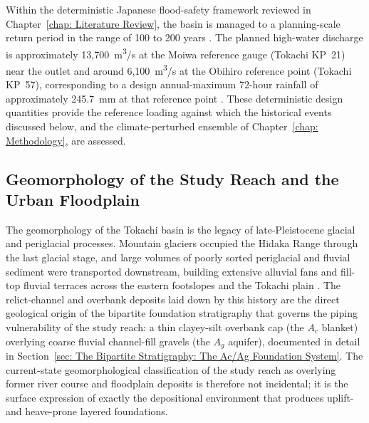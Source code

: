 Within the deterministic Japanese flood-safety framework reviewed in Chapter~\ref{chap: Literature Review}, the basin is managed to a planning-scale return period in the range of 100 to 200 years \parencite{final_report_2022, wp1_report_2021}. The planned high-water discharge is approximately 13{,}700~m\textsuperscript{3}/s at the Moiwa reference gauge (Tokachi KP~21) near the outlet and around 6{,}100~m\textsuperscript{3}/s at the Obihiro reference point (Tokachi KP~57), corresponding to a design annual-maximum 72-hour rainfall of approximately 245.7~mm at that reference point \parencite{fukuoka_2019, wp1_report_2021}. These deterministic design quantities provide the reference loading against which the historical events discussed below, and the climate-perturbed ensemble of Chapter~\ref{chap: Methodology}, are assessed.

\subsection{Geomorphology of the Study Reach and the Urban Floodplain}
\label{subsec: Geomorphology of the Study Reach and the Urban Floodplain}

The geomorphology of the Tokachi basin is the legacy of late-Pleistocene glacial and periglacial processes. Mountain glaciers occupied the Hidaka Range through the last glacial stage, and large volumes of poorly sorted periglacial and fluvial sediment were transported downstream, building extensive alluvial fans and fill-top fluvial terraces across the eastern footslopes and the Tokachi plain \parencite{furuichi_2018}. The relict-channel and overbank deposits laid down by this history are the direct geological origin of the bipartite foundation stratigraphy that governs the piping vulnerability of the study reach: a thin clayey-silt overbank cap (the $A_c$ blanket) overlying coarse fluvial channel-fill gravels (the $A_g$ aquifer), documented in detail in Section~\ref{sec: The Bipartite Stratigraphy: The Ac/Ag Foundation System}. The current-state geomorphological classification of the study reach as overlying former river course and floodplain deposits \parencite{fukuda_2025_internal} is therefore not incidental; it is the surface expression of exactly the depositional environment that produces uplift- and heave-prone layered foundations.

